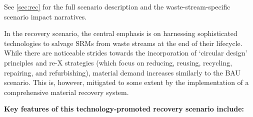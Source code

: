 \iconRECbig

See \autoref{sec:rec} for the full scenario description and the waste-stream-specific scenario impact narratives.

In the recovery scenario, the central emphasis is on harnessing sophisticated technologies to salvage SRMs from waste streams at the end of their lifecycle. While there are noticeable strides towards the incorporation of `circular design' principles and re-X strategies (which focus on reducing, reusing, recycling, repairing, and refurbishing), material demand increases similarly to the BAU scenario. This is, however, mitigated to some extent by the implementation of a comprehensive material recovery system.



\textbf{Key features of this technology-promoted recovery scenario include:}
